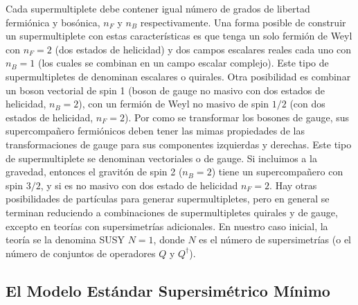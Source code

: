 Cada supermultiplete debe contener igual número de grados de libertad fermiónica y bosónica, $n_F$ y $n_B$ respectivamente. Una forma posible de construir un supermultiplete con estas características es que tenga un solo fermión de Weyl con $n_F=2$ (dos estados de helicidad) y dos campos escalares reales cada uno con $n_B=1$ (los cuales se combinan en un campo escalar complejo). Este tipo de supermultipletes de denominan escalares o quirales. Otra posibilidad es combinar un boson vectorial de spin 1 (boson de gauge no masivo con dos estados de helicidad, $n_B=2$), con un fermión de Weyl no masivo de spin $1/2$ (con dos estados de helicidad, $n_F=2$). Por como se transformar los bosones de gauge, sus supercompañero fermiónicos deben tener las mimas propiedades de las transformaciones de gauge para sus componentes izquierdas y derechas. Este tipo de supermultiplete se denominan vectoriales o de gauge. Si incluimos a la gravedad, entonces el gravitón de spin 2 ($n_B=2$) tiene un supercompañero con spin $3/2$, y si es no masivo con dos estado de helicidad $n_F=2$. Hay otras posibilidades de partículas para generar supermultipletes, pero en general se terminan reduciendo a combinaciones de supermultipletes quirales y de gauge, excepto en teorías con supersimetrías adicionales. En nuestro caso inicial, la teoría se la denomina SUSY $N=1$, donde $N$ es el número de supersimetrías (o el número de conjuntos de operadores $Q$ y $Q^{\dagger}$). 

\subsection{El Modelo Estándar Supersimétrico Mínimo}

